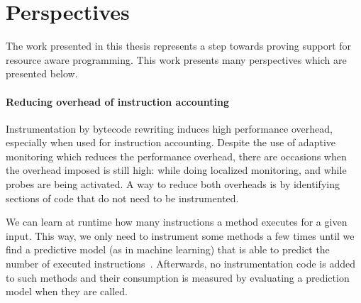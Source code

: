 \section{Perspectives}

The work presented in this thesis represents a step towards proving support for resource aware programming.
This work presents many perspectives which are presented below. 



\paragraph{Reducing overhead of instruction accounting}

Instrumentation by bytecode rewriting induces high performance overhead, especially when used for instruction accounting.
Despite the use of adaptive monitoring which reduces the performance overhead, there are occasions when the overhead imposed is still high: while doing localized monitoring, and while probes are being activated.
A way to reduce both overheads is by identifying sections of code that do not need to be instrumented.

We can learn at runtime how many instructions a method executes for a given input.
This way, we only need to instrument some methods a few times until we find a predictive model (as in machine learning) that is able to predict the number of executed instructions~\cite{tesauro2006hybrid}.
Afterwards, no instrumentation code is added to such methods and their consumption is measured by evaluating a prediction model when they are called.
 

